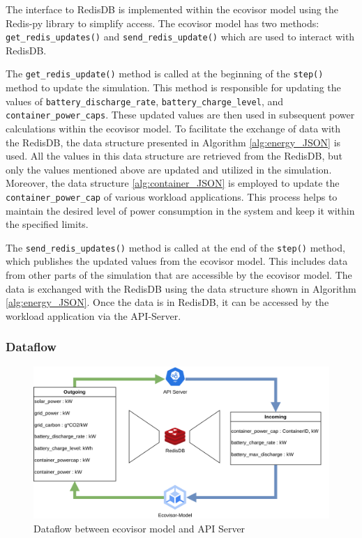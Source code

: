 The interface to RedisDB is implemented within the ecovisor model using the
Redis-py library \cite{Redis-py} to simplify access. The ecovisor model has two
methods: \texttt{get\_redis\_updates()} and \texttt{send\_redis\_update()} which
are used to interact with RedisDB.

The \texttt{get\_redis\_update()} method is called at the beginning of the
\texttt{step()} method to update the simulation. This method is responsible for
updating the values of \texttt{battery\_discharge\_rate},
\texttt{battery\_charge\_level}, and \texttt{container\_power\_caps}. These
updated values are then used in subsequent power calculations within the
ecovisor model. To facilitate the exchange of data with the RedisDB, the data
structure presented in Algorithm \ref{alg:energy_JSON} is used. All the values
in this data structure are retrieved from the RedisDB, but only the values
mentioned above are updated and utilized in the simulation. Moreover, the data
structure \ref{alg:container_JSON} is employed to update the
\texttt{container\_power\_cap} of various workload applications. This process
helps to maintain the desired level of power consumption in the system and keep
it within the specified limits.

The \texttt{send\_redis\_updates()} method is called at the end of the
\texttt{step()} method, which publishes the updated values from the ecovisor
model. This includes data from other parts of the simulation that are accessible
by the ecovisor model. The data is exchanged with the RedisDB using the data
structure shown in Algorithm \ref{alg:energy_JSON}. Once the data is in RedisDB,
it can be accessed by the workload application via the API-Server.

\subsubsection{Dataflow}
\label{subsec:dataflow}
\begin{figure}
    \centering
    \includegraphics[width=\linewidth]{figures/Dataflow.drawio.png}
    \caption{Dataflow between ecovisor model and API Server}
    \label{fig:dataflow}
\end{figure}

